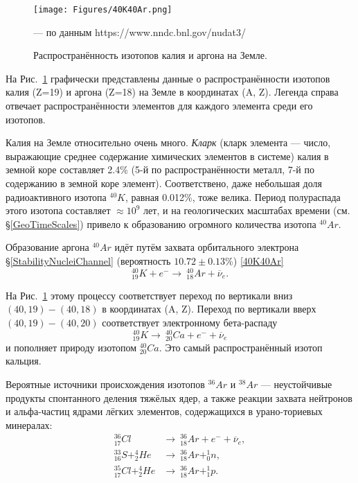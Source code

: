 \documentclass[a5paper,openany]{book}
\newcommand{\ov}{\overline}
\begin{document}
\begin{figure}[ht] 
	\centering\small
	\texttt{[image: Figures/40K40Ar.png]}
	\caption{Распространённость изотопов калия и аргона на Земле.} 
	--- по данным https://www.nndc.bnl.gov/nudat3/
	\label{f:40K40Ar}
\end{figure}

На Рис.~\ref{f:40K40Ar} графически представлены данные о распространённости изотопов калия (Z=19) и аргона (Z=18) на Земле в координатах (A, Z).
Легенда справа отвечает распространённости элементов для каждого элемента среди его изотопов. 

Калия на Земле относительно очень много. {\it Кларк}  (кларк элемента --- число, выражающие среднее содержание химических элементов в системе) калия в земной коре составляет 2.4\% (5-й по распространённости металл, 7-й по содержанию в земной коре элемент). Соответствено, даже небольшая доля радиоактивного изотопа $^{40}K$, равная 0.012\%, тоже велика. Период полураспада этого изотопа составляет $\approx 10^9$ лет, и на геологических масштабах времени (см. \S\ref{GeoTimeScales}) привело к образованию огромного количества изотопа $^{40}Ar$.

Образование аргона $^{40}Ar$ идёт путём захвата орбитального электрона \S\ref{StabilityNucleiChannel} (вероятность $10.72 \pm 0.13$\%)  \eqref{40K40Ar}
\begin{equation}\label{40K40Ar}
	^{40}_{19}K + e^{-} \longrightarrow \ ^{40}_{18}Ar + \ov{\nu}_e.
\end{equation}

На Рис.~\ref{f:40K40Ar} этому процессу соответствует переход по вертикали вниз $(40,19)-(40,18)$ в координатах (A, Z). Переход по вертикали вверх $(40,19)-(40,20)$ соответствует электронному бета-распаду 
\begin{equation}
	^{40}_{19}K \longrightarrow \ ^{40}_{20}Ca + e^{-} + \ov{\nu}_e
\end{equation}
и пополняет природу изотопом  $^{40}_{20}Ca$. Это самый распространённый изотоп кальция.

Вероятные источники происхождения изотопов $^{36}Ar$  и $^{38}Ar$  --- неустойчивые продукты спонтанного деления тяжёлых ядер, а также реакции захвата нейтронов и альфа-частиц ядрами лёгких элементов, содержащихся в урано-ториевых минералах:
\begin{align}
^{36}_{17}Cl & \longrightarrow \ ^{36}_{18}Ar + e^{-} + \ov{\nu}_e, \\
^{33}_{16}S + ^{4}_2{He} & \longrightarrow \ ^{36}_{18}Ar + ^1_0n, \\
^{35}_{17}Cl  + ^{4}_2{He} & \longrightarrow \ ^{36}_{18}Ar + ^1_1p.
\end{align}
\end{document}
